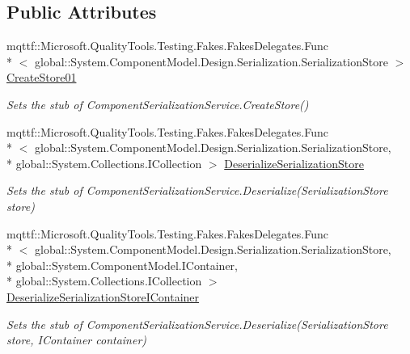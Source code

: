 \subsection*{Public Attributes}
\begin{DoxyCompactItemize}
\item 
mqttf\-::\-Microsoft.\-Quality\-Tools.\-Testing.\-Fakes.\-Fakes\-Delegates.\-Func\\*
$<$ global\-::\-System.\-Component\-Model.\-Design.\-Serialization.\-Serialization\-Store $>$ \hyperlink{class_system_1_1_component_model_1_1_design_1_1_serialization_1_1_fakes_1_1_stub_component_serialization_service_ab4cf3ec039b89409ab3db04cf9346a57}{Create\-Store01}
\begin{DoxyCompactList}\small\item\em Sets the stub of Component\-Serialization\-Service.\-Create\-Store()\end{DoxyCompactList}\item 
mqttf\-::\-Microsoft.\-Quality\-Tools.\-Testing.\-Fakes.\-Fakes\-Delegates.\-Func\\*
$<$ global\-::\-System.\-Component\-Model.\-Design.\-Serialization.\-Serialization\-Store, \\*
global\-::\-System.\-Collections.\-I\-Collection $>$ \hyperlink{class_system_1_1_component_model_1_1_design_1_1_serialization_1_1_fakes_1_1_stub_component_serialization_service_a1c39d4e88fef06f734a53c24ebf0a713}{Deserialize\-Serialization\-Store}
\begin{DoxyCompactList}\small\item\em Sets the stub of Component\-Serialization\-Service.\-Deserialize(\-Serialization\-Store store)\end{DoxyCompactList}\item 
mqttf\-::\-Microsoft.\-Quality\-Tools.\-Testing.\-Fakes.\-Fakes\-Delegates.\-Func\\*
$<$ global\-::\-System.\-Component\-Model.\-Design.\-Serialization.\-Serialization\-Store, \\*
global\-::\-System.\-Component\-Model.\-I\-Container, \\*
global\-::\-System.\-Collections.\-I\-Collection $>$ \hyperlink{class_system_1_1_component_model_1_1_design_1_1_serialization_1_1_fakes_1_1_stub_component_serialization_service_a4ae8cc7468a930bb20e70f7e51eb146a}{Deserialize\-Serialization\-Store\-I\-Container}
\begin{DoxyCompactList}\small\item\em Sets the stub of Component\-Serialization\-Service.\-Deserialize(\-Serialization\-Store store, I\-Container container)\end{DoxyCompactList}\item 

\end{DoxyCompactItemize}
